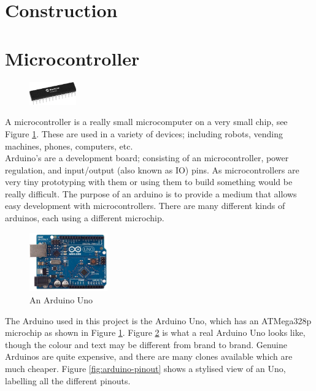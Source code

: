 \documentclass[a4paper,12pt]{article}
\begin{document}
\section{Construction}

\pagebreak
\section{Microcontroller} \label{sec:microcontroller}
\begin{figure}
    \includegraphics[width=0.18\textwidth]{medium-ATmega328-SPDIP-28.png}
    \label{fig:microchip}
\end{figure}

A microcontroller is a really small microcomputer on a very small chip, see Figure \ref{fig:microchip}.
These are used in a variety of devices; including robots, vending machines, phones, computers, etc. \\

Arduino's are a development board; consisting of an microcontroller, power regulation, and input/output (also known as IO) pins. As microcontrollers are very tiny prototyping with them or using them to build something would be really difficult. The purpose of an arduino is to provide a medium that allows easy development with microcontrollers. There are many different kinds of arduinos, each using a different microchip.  \\

\begin{figure}
    \includegraphics[width=0.3\textwidth]{arduino-uno.jpg}
    \caption{An Arduino Uno}
    \label{fig:arduino-real}
\end{figure}


The Arduino used in this project is the Arduino Uno, which has an ATMega328p microchip as shown in Figure \ref{fig:microchip}. Figure \ref{fig:arduino-real} is what a real Arduino Uno looks like, though the colour and text may be different from brand to brand. Genuine Arduinos are quite expensive, and there are many clones available which are much cheaper. Figure \ref{fig:arduino-pinout} shows a stylised view of an Uno, labelling all the different pinouts. \\
\end{document}
